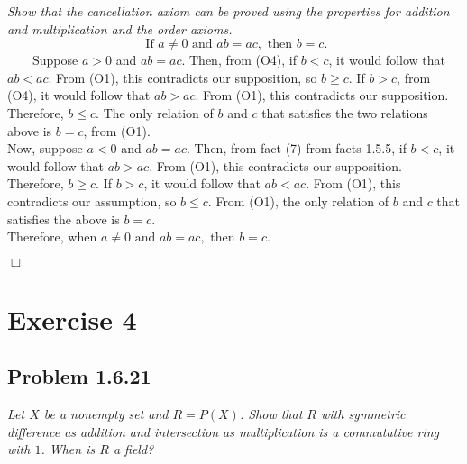 \documentclass[
]{article}
\begin{document}
\emph{Show that the cancellation axiom can be proved using the
properties for addition and multiplication and the order axioms.}\\
\[\text{ If } a \neq 0 \text{ and } ab = ac, \text{ then } b = c.\]
~~~~Suppose \(a > 0\) and \(ab = ac\). Then, from (O4), if \(b < c\), it
would follow that \(ab < ac\). From (O1), this contradicts our
supposition, so \(b \geq c\). If \(b > c\), from (O4), it would follow
that \(ab > ac\). From (O1), this contradicts our supposition.
Therefore, \(b \leq c\). The only relation of \(b\) and \(c\) that
satisfies the two relations above is \(b = c\), from (O1).\\
\hspace*{0.333em}\hspace*{0.333em}\hspace*{0.333em}\hspace*{0.333em}Now,
suppose \(a < 0\) and \(ab = ac\). Then, from fact (7) from facts 1.5.5,
if \(b < c\), it would follow that \(ab > ac\). From (O1), this
contradicts our supposition. Therefore, \(b \geq c\). If \(b > c\), it
would follow that \(ab < ac\). From (O1), this contradicts our
assumption, so \(b\leq c\). From (O1), the only relation of \(b\) and
\(c\) that satisfies the above is \(b = c\).\\
\hspace*{0.333em}\hspace*{0.333em}\hspace*{0.333em}\hspace*{0.333em}Therefore,
when \(a \neq 0 \text{ and } ab = ac, \text{ then } b = c.\)

\hfill \(\Box\)

\hypertarget{exercise-4}{%
\section{Exercise 4}\label{exercise-4}}

\hypertarget{problem-1.6.21}{%
\subsection{Problem 1.6.21}\label{problem-1.6.21}}

\emph{Let \(X\) be a nonempty set and \(R = P(X)\). Show that \(R\) with
symmetric difference as addition and intersection as multiplication is a
commutative ring with \(1\). When is \(R\) a field?}
\end{document}
